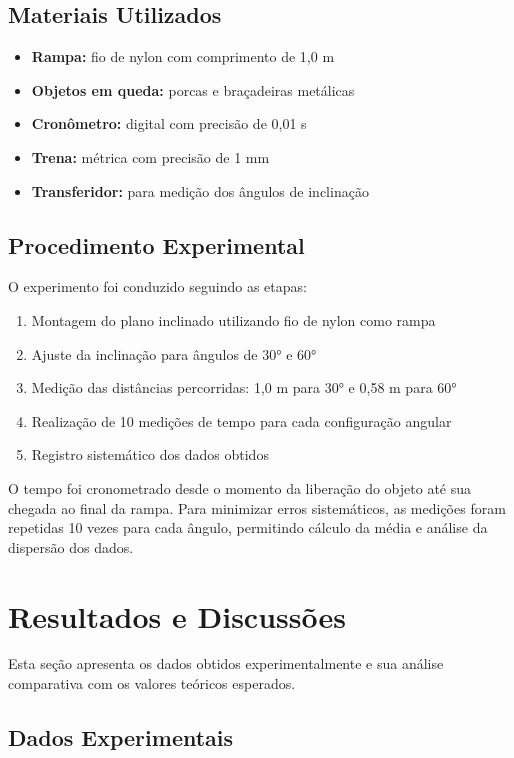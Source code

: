 \documentclass[a4paper, 12pt]{article}
\begin{document}
\subsection{Materiais Utilizados}
\begin{itemize}
	\item \textbf{Rampa:} fio de nylon com comprimento de 1,0 m
	\item \textbf{Objetos em queda:} porcas e braçadeiras metálicas
	\item \textbf{Cronômetro:} digital com precisão de 0,01 s
	\item \textbf{Trena:} métrica com precisão de 1 mm
	\item \textbf{Transferidor:} para medição dos ângulos de inclinação
\end{itemize}

\subsection{Procedimento Experimental}
O experimento foi conduzido seguindo as etapas:
\begin{enumerate}
	\item Montagem do plano inclinado utilizando fio de nylon \newline como rampa
	\item Ajuste da inclinação para ângulos de 30° e 60°
	\item Medição das distâncias percorridas: 1,0 m para 30° e 0,58 m para 60°
	\item Realização de 10 medições de tempo para cada configuração angular
	\item Registro sistemático dos dados obtidos
\end{enumerate}

O tempo foi cronometrado desde o momento da liberação do objeto até sua chegada ao final da rampa. Para minimizar erros sistemáticos, as medições foram repetidas 10 vezes para cada ângulo, permitindo cálculo da média e análise da dispersão dos dados.

\section{Resultados e Discussões}
Esta seção apresenta os dados obtidos experimentalmente e sua análise comparativa com os valores teóricos esperados.

\subsection{Dados Experimentais}
\end{document}
